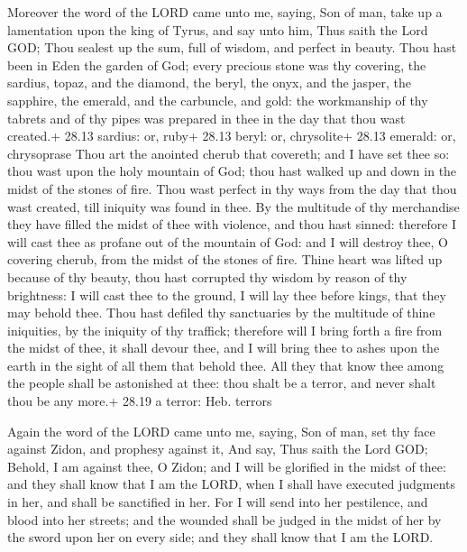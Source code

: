  Moreover the word of the LORD came unto me, saying,
 Son of man, take up a lamentation upon the king of Tyrus,
and say unto him, Thus saith the Lord GOD; Thou sealest up the sum, full
of wisdom, and perfect in beauty.  Thou hast been in Eden
the garden of God; every precious stone was thy covering, the sardius,
topaz, and the diamond, the beryl, the onyx, and the jasper, the
sapphire, the emerald, and the carbuncle, and gold: the workmanship of
thy tabrets and of thy pipes was prepared in thee in the day that thou
wast created.+ 28.13 sardius: or, ruby+ 28.13 beryl: or, chrysolite+
28.13 emerald: or, chrysoprase  Thou art the anointed
cherub that covereth; and I have set thee so: thou wast upon the holy
mountain of God; thou hast walked up and down in the midst of the stones
of fire.  Thou wast perfect in thy ways from the day that
thou wast created, till iniquity was found in thee.  By the
multitude of thy merchandise they have filled the midst of thee with
violence, and thou hast sinned: therefore I will cast thee as profane
out of the mountain of God: and I will destroy thee, O covering cherub,
from the midst of the stones of fire.  Thine heart was
lifted up because of thy beauty, thou hast corrupted thy wisdom by
reason of thy brightness: I will cast thee to the ground, I will lay
thee before kings, that they may behold thee.  Thou hast
defiled thy sanctuaries by the multitude of thine iniquities, by the
iniquity of thy traffick; therefore will I bring forth a fire from the
midst of thee, it shall devour thee, and I will bring thee to ashes upon
the earth in the sight of all them that behold thee.  All
they that know thee among the people shall be astonished at thee: thou
shalt be a terror, and never shalt thou be any more.+ 28.19 a terror:
Heb. terrors

 Again the word of the LORD came unto me, saying,
 Son of man, set thy face against Zidon, and prophesy
against it,  And say, Thus saith the Lord GOD; Behold, I am
against thee, O Zidon; and I will be glorified in the midst of thee: and
they shall know that I am the LORD, when I shall have executed judgments
in her, and shall be sanctified in her.  For I will send
into her pestilence, and blood into her streets; and the wounded shall
be judged in the midst of her by the sword upon her on every side; and
they shall know that I am the LORD.


